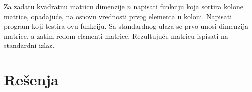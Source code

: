 \begin{Answer}[ref=526]
\end{Answer}
\begin{Exercise}[label=527]
  Za zadatu kvadratnu matricu dimenzije $n$ napisati funkciju koja
  sortira kolone matrice, opadajuće, na osnovu vrednosti prvog
  elementa u koloni.  Napisati program koji testira ovu funkciju. Sa
  standardnog ulaza se prvo unosi dimenzija matrice, a zatim redom
  elementi matrice.  Rezultujuću matricu ispisati na standardni izlaz.
  
\end{Exercise}


\section{Rešenja}
\shipoutAnswer



